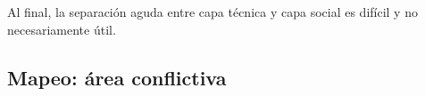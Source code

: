 Al final, la separación aguda entre capa técnica y capa social es difícil y no necesariamente útil.

\begin{comment}

[FiTre2015]
"we show how the current revival of grassroots community networks can counterbalance the erosion of autonomy of Internet users that results from current
telecom policies."

it's an ongoing work -- the infrastructure crumples if people cease to maintain it and provide broadband

---
[Rieder2012]

> framing the Internet alternately as lawless, anarchic,
> free, “a world where anyone, anywhere may express his or her beliefs, no matter how singular,
> without fear of being coerced into silence or conformity” (Barlow 1996) (p.1)

* la infraestructura está prerequisito para participación

## Conclusión del texto [Rieder2012]

> If technology won’t deliver us from the conundrums of
> governance, negotiation, and struggle, we
> may as well reengage politics proper[ly].

* sobre todo problemas sociales/políticos: organización de grupos (no tanto técnicos): ¿cómo decidimos como grupo? ¿quién hace qué? ¿quién está responsable?
* soluciones políticas para problemas políticos
\end{comment}

\subsection{Mapeo: área conflictiva}

